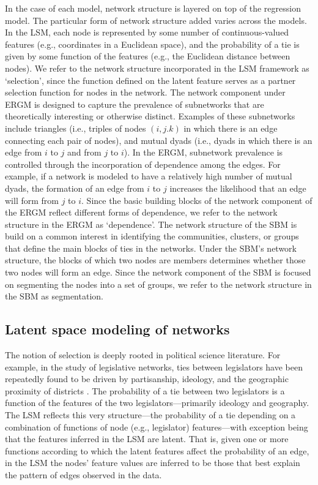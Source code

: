 \documentclass[fleqn,12pt]{wlscirep}
\begin{document}
In the case of each model, network structure is layered on top of the regression model. The particular form of network structure added varies across the models. In the LSM, each node is represented by some number of continuous-valued features (e.g., coordinates in a Euclidean space), and the probability of a tie is given by some function of the features (e.g., the Euclidean distance between nodes). We refer to the network structure incorporated in the LSM framework as `selection', since the function defined on the latent feature serves as a partner selection function for nodes in the network. The network component under ERGM is designed to capture the prevalence of subnetworks that are theoretically interesting or otherwise distinct. Examples of these subnetworks include triangles (i.e., triples of nodes $(i,j.k)$ in which there is an edge connecting each pair of nodes), and mutual dyads (i.e., dyads in which there is an edge from $i$ to $j$ and from $j$ to $i$). In the ERGM, subnetwork prevalence is controlled through the incorporation of dependence among the edges. For example, if a network is modeled to have a relatively high number of mutual dyads, the formation of an edge from $i$ to $j$ increases the likelihood that an edge will form from $j$ to $i$. Since the basic building blocks of the network component of the ERGM reflect different forms of dependence, we refer to the network structure in the ERGM as `dependence'. The network structure of the SBM is build on a common interest in identifying the communities, clusters, or groups that define the main blocks of ties in the networks. Under the SBM's network structure, the blocks of which two nodes are members determines whether those two nodes will form an edge. Since the network component of the SBM is focused on segmenting the nodes into a set of groups, we refer to the network structure in the SBM as segmentation.

\subsection{Latent space modeling of networks}

The notion of selection is deeply rooted in political science literature. For example,  in  the study of legislative networks, ties between legislators have been repeatedly found to be driven by partisanship, ideology, and the geographic proximity of districts \citep{osei2018party,bratton2011networks,clark2013multimember}.   The probability of a tie between two legislators is a function of the features of the two legislators---primarily ideology and geography. The LSM reflects this very structure---the probability of a tie depending on a combination of functions of node (e.g., legislator) features---with exception being that the features inferred in the LSM are latent. That is, given one or more functions according to which the latent features affect the probability of an edge,  in the LSM the nodes' feature values are inferred to be those that best explain the pattern of edges observed in the data.
\end{document}
